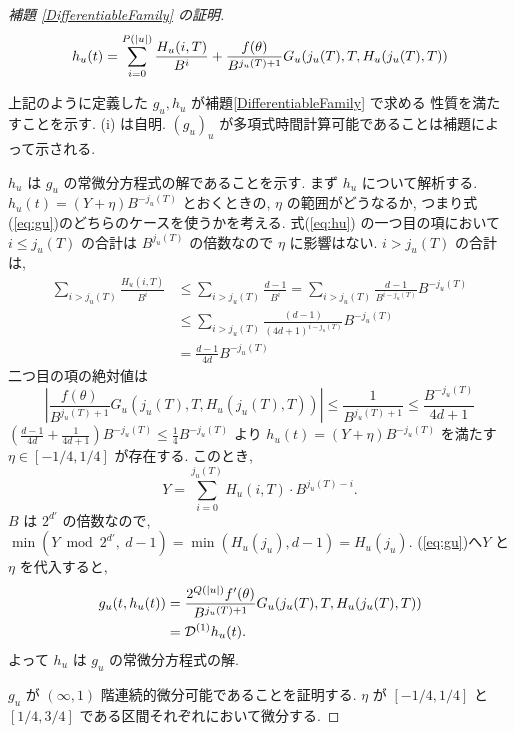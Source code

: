 \begin{proof}[\rm 補題 \ref{DifferentiableFamily} の証明]
 \begin{equation} 
  h_u(t) = \sum^{{P(|u|)}}_{i=0} \frac{H_u(i, T)}{B^i}  
  + \frac{f(\theta)}{B^{j_u(T)+1}} G_u(j_u(T), T, H_u(j_u(T), T)) 
  \label{eq:hu}
 \end{equation}

 上記のように定義した $g_u, h_u$ が補題\ref{DifferentiableFamily} で求める
 性質を満たすことを示す. (i) は自明. 
 $(g_u)_u$ が多項式時間計算可能であることは補題によって示される.

 $h_u$ は $g_u$ の常微分方程式の解であることを示す.
 まず $h_u$ について解析する. 
  $h_u(t) = (Y + \eta) B^{-j_u(T)}$ とおくときの, $\eta$ の範囲がどうなるか,
  つまり式(\ref{eq:gu})のどちらのケースを使うかを考える.
  式(\ref{eq:hu}) の一つ目の項において
 $i \le j_u(T)$ の合計は $B^{j_u(T)}$ の倍数なので $\eta$ に影響はない.
  $i > j_u(T)$ の合計は, 
 \begin{align*}
  \sum_{i>j_u(T)} \frac{H_u(i, T)}{B^i} 
  & \le \sum_{i>j_u(T)} \frac{d-1}{B^i} 
   = \sum_{i>j_u(T)} \frac{d-1}{B^{i-j_u(T)}}B^{-j_u(T)} \\
  & \le \sum_{i>j_u(T)} \frac{(d-1)}{(4d+1)^{i-j_u(T)}}B^{-j_u(T)} \\
  & = \frac{d-1}{4d}B^{-j_u(T)}
 \end{align*}
 二つ目の項の絶対値は
 \begin{equation}
  \left| \frac{f(\theta)}{B^{j_u(T)+1}} G_u(j_u(T), T, H_u(j_u(T), T)) \right|
  \le \frac{1}{B^{j_u(T)+1}}
  \le \frac{B^{-j_u(T)}}{4d+1}
 \end{equation}
 $(\frac{d-1}{4d} + \frac{1}{4d+1})B^{-j_u(T)} \le \frac 1 4 B^{-j_u(T)} $
  より $h_u(t) = (Y + \eta) B^{-j_u(T)}$ を満たす $\eta \in [-1/4, 1/4]$
 が存在する. このとき,
 \begin{equation}
  Y = \sum_{i=0}^{j_u(T)}H_u(i, T) \cdot B^{j_u(T) - i} .
 \end{equation}
 $B$ は $2^{d'}$ の倍数なので, 
 $\min (Y \bmod 2^{d'}\!\!\!,\ d-1) = \min (H_u(j_u), d-1) = H_u(j_u)$. 
 (\ref{eq:gu})へ$Y$ と $\eta$ を代入すると,
 \begin{align*}
   g_u(t, h_u(t)) 
  & =  \frac{2^{Q(|u|)} f'(\theta)}{B^{j_u(T)+1}}
   G_u(j_u(T), T, H_u(j_u(T), T)) \\
  & =  \mathcal D^{(1)}h_u(t).
 \end{align*}
 よって $h_u$ は $g_u$ の常微分方程式の解.

  $g_u$ が $(\infty, 1)$ 階連続的微分可能であることを証明する.
  $\eta$ が $[-1/4, 1/4]$ と $[1/4, 3/4]$ である区間それぞれにおいて微分する.


\end{proof}
